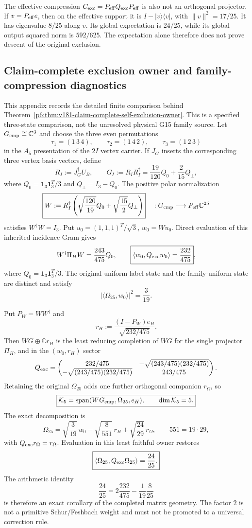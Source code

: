 \documentclass[11pt,a4paper]{article}
\begin{document}
The effective compression \(C_{\rm exc}=P_{\rm eff}Q_{\rm exc}P_{\rm eff}\)
is also not an orthogonal projector.  If \(v=P_{\rm eff}e\), then on the
effective support it is \(I-|v\rangle\langle v|\), with
\(\|v\|^2=17/25\).  It has eigenvalue \(8/25\) along \(v\).
Its global expectation is \(24/25\), while its global output squared
norm is \(592/625\).  The expectation alone therefore does not prove
descent of the original exclusion.


\subsection{Claim-complete exclusion owner and family-compression diagnostics}
\label{p6:app:v181-exclusion-owner-completion}
This appendix records the detailed finite comparison behind
Theorem~\ref{p6:thm:v181-claim-complete-self-exclusion-owner}.  This is a
specified three-state comparison, not the unresolved physical G15 family
source.  Let $G_{\rm cmp}\cong\mathbb C^3$ and choose the three even
permutations
\[
 \tau_1=(1\,3\,4),\qquad
 \tau_2=(1\,4\,2),\qquad
 \tau_3=(1\,2\,3)
\]
in the $A_5$ presentation of the $2I$ vertex carrier.  If $J_G$ inserts the
corresponding three vertex basis vectors, define
\[
 R_I:=J_G^\dagger U_B,\qquad
 G_I:=R_IR_I^\dagger
 =\frac{19}{120}Q_0+\frac2{15}Q_\perp,
\]
where $Q_0=\mathbf1_3\mathbf1_3^T/3$ and $Q_\perp=I_3-Q_0$.  The positive
polar normalization
\[
 \boxed{W:=R_I^\dagger
 \left(\sqrt{\frac{120}{19}}Q_0+\sqrt{\frac{15}{2}}Q_\perp\right)}
 \quad:G_{\rm cmp}\longrightarrow P_{\rm eff}\mathbb C^{25}
\]
satisfies $W^\dagger W=I_3$.  Put
$u_0=(1,1,1)^T/\sqrt3$, $w_0=Wu_0$.  Direct evaluation of this inherited
incidence Gram gives
\[
 W^\dagger\Pi_HW=\frac{243}{475}Q_0,
 \qquad
 \boxed{\langle w_0,Q_{\rm exc}w_0\rangle=\frac{232}{475}},
\]
where $Q_0=\mathbf1_3\mathbf1_3^T/3$.  The original uniform label state and
the family-uniform state are distinct and satisfy
\[
 \boxed{|\langle\Omega_{25},w_0\rangle|^2=\frac3{19}.}
\]

Put $P_W=WW^\dagger$ and
\[
 r_H:=\frac{(I-P_W)e_H}{\sqrt{232/475}}.
\]
Then $WG\oplus\mathbb Cr_H$ is the least reducing completion of $WG$ for the
single projector $\Pi_H$, and in the $(w_0,r_H)$ sector
\[
 Q_{\rm exc}=
 \begin{pmatrix}
 232/475&-\sqrt{(243/475)(232/475)}\\
 -\sqrt{(243/475)(232/475)}&243/475
 \end{pmatrix}.
\]
Retaining the original $\Omega_{25}$ adds one further orthogonal companion
$r_\Omega$, so
\[
 \boxed{\mathcal K_5=\operatorname{span}(W G_{\rm cmp},\Omega_{25},e_H),\qquad
 \dim\mathcal K_5=5.}
\]
The exact decomposition is
\[
 \Omega_{25}
 =\sqrt{\frac3{19}}\,w_0
 -\sqrt{\frac8{551}}\,r_H
 +\sqrt{\frac{24}{29}}\,r_\Omega,
 \qquad 551=19\cdot29,
\]
with $Q_{\rm exc}r_\Omega=r_\Omega$.  Evaluation in this least faithful owner
restores
\[
 \boxed{\langle\Omega_{25},Q_{\rm exc}\Omega_{25}\rangle=\frac{24}{25}.}
\]
The arithmetic identity
\[
 \boxed{\frac{24}{25}
 =2\frac{232}{475}-\frac1{19}\frac8{25}}
\]
is therefore an exact corollary of the completed matrix geometry.  The factor
$2$ is not a primitive Schur/Feshbach weight and must not be promoted to a
universal correction rule.
\end{document}
